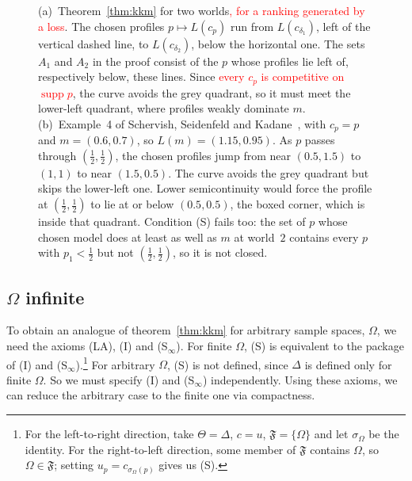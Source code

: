 \documentclass[11pt]{article}
\theoremstyle{definition}
\theoremstyle{remark}
\newcommand{\F}{\mathfrak F}
\newcommand{\supp}{\operatorname{supp}}
\begin{document}
\begin{figure}[ht]
\caption{(a)~Theorem~\ref{thm:kkm} for two worlds\textcolor{red}{, for a ranking generated by a loss}. The chosen profiles $p\mapsto L(c_p)$ run from $L(c_{\delta_1})$, left of the vertical dashed line, to $L(c_{\delta_2})$, below the horizontal one. The sets $A_1$ and $A_2$ in the proof consist of the $p$ whose profiles lie left of, respectively below, these lines. Since \textcolor{red}{every $c_p$ is competitive on $\supp p$}, the curve avoids the grey quadrant, so it must meet the lower-left quadrant, where profiles weakly dominate $m$. (b)~Example~4 of Schervish, Seidenfeld and Kadane~\cite{SSK09}, with $c_p=p$ and $m=(0.6,0.7)$, so $L(m)=(1.15,0.95)$. As $p$ passes through $(\tfrac12,\tfrac12)$, the chosen profiles jump from near $(0.5,1.5)$ to $(1,1)$ to near $(1.5,0.5)$. The curve avoids the grey quadrant but skips the lower-left one. Lower semicontinuity would force the profile at $(\tfrac12,\tfrac12)$ to lie at or below $(0.5,0.5)$, the boxed corner, which is inside that quadrant. Condition (S) fails too: the set of $p$ whose chosen model does at least as well as $m$ at world~$2$ contains every $p$ with $p_1<\tfrac12$ but not $(\tfrac12,\tfrac12)$, so it is not closed.}
\label{fig:profiles}
\end{figure}






\subsection{$\Omega$ infinite}\label{sec:infinite}


To obtain an analogue of theorem~\ref{thm:kkm} for arbitrary sample spaces, $\Omega$, we need the axioms (LA), (I) and (S$_\infty$). For finite $\Omega$, (S) is equivalent to the package of (I) and (S$_\infty$).\footnote{For the left-to-right direction, take $\Theta=\Delta$, $c=u$, $\F=\{\Omega\}$ and let $\sigma_\Omega$ be the identity. For the right-to-left direction, some member of $\F$ contains $\Omega$, so $\Omega\in\F$; setting $u_p=c_{\sigma_\Omega(p)}$ gives us (S).} For arbitrary $\Omega$, (S) is not defined, since $\Delta$ is defined only for finite $\Omega$. So we must specify (I) and (S$_\infty$) independently. Using these axioms, we can reduce the arbitrary case to the finite one via compactness.
\end{document}
